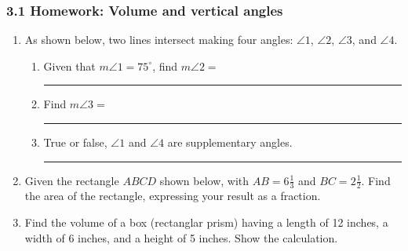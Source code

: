 \documentclass[12pt, twoside]{article}
\begin{document}
\subsubsection*{3.1 Homework: Volume and vertical angles}
  \begin{enumerate}

  \item As shown below, two lines intersect making four angles: $\angle 1$, $\angle 2$, $\angle 3$, and $\angle 4$.
    \begin{center}
    \end{center}
    \begin{enumerate}
    \item Given that $m\angle 1= 75^\circ$, find $m\angle 2=$ \rule{2.5cm}{0.15mm} \bigskip
    \item Find $m\angle 3=$ \rule{2.5cm}{0.15mm} \bigskip
    \item True or false, $\angle 1$ and $\angle 4$ are supplementary angles. \rule{3cm}{0.15mm}
  \end{enumerate}

  \item Given the rectangle $ABCD$ shown below, with $AB=6 \frac{1}{3}$ and $BC=2 \frac{1}{2}$. Find the area of the rectangle, expressing your result as a fraction.
\begin{flushright}
\end{flushright} \vspace{2cm}  

\item Find the volume of a box (rectanglar prism) having a length of 12 inches, a width of 6 inches, and a height of 5 inches. Show the calculation.


\end{enumerate}
\end{document}
